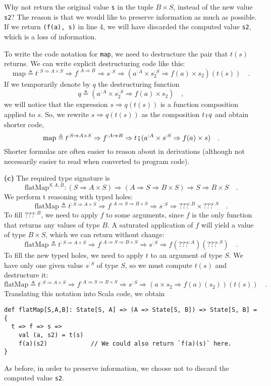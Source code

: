 \noindent Why not return the original value \lstinline!s! in the
tuple $B\times S$, instead of the new value \lstinline!s2!? The
reason is that we would like to preserve information as much as possible.
If we return \lstinline!(f(a), s)! in line 4, we will have discarded
the computed value \lstinline!s2!, which is a loss of information.

To write the code notation for \lstinline!map!, we need to destructure
the pair that $t(s)$ returns. We can write explicit destructuring
code like this:
\[
\text{map}\triangleq t^{:S\Rightarrow A\times S}\Rightarrow f^{:A\Rightarrow B}\Rightarrow s^{:S}\Rightarrow(a^{:A}\times s_{2}^{:S}\Rightarrow f(a)\times s_{2})(t(s))\quad.
\]
If we temporarily denote by $q$ the destructuring function 
\[
q\triangleq(a^{:A}\times s_{2}^{:S}\Rightarrow f(a)\times s_{2})\quad,
\]
we will notice that the expression $s\Rightarrow q(t(s))$ is a function
composition applied to $s$. So, we rewrite $s\Rightarrow q(t(s))$
as the composition $t\bef q$ and obtain shorter code, 
\[
\text{map}\triangleq t^{:S\Rightarrow A\times S}\Rightarrow f^{:A\Rightarrow B}\Rightarrow t\bef(a^{:A}\times s^{:S}\Rightarrow f(a)\times s)\quad.
\]
Shorter formulas are often easier to reason about in derivations (although
not necessarily easier to read when converted to program code).

\textbf{(c)} The required type signature is
\[
\text{flatMap}^{S,A,B}:(S\Rightarrow A\times S)\Rightarrow(A\Rightarrow S\Rightarrow B\times S)\Rightarrow S\Rightarrow B\times S\quad.
\]
We perform t reasoning with typed holes:
\[
\text{flatMap}\triangleq t^{:S\Rightarrow A\times S}\Rightarrow f^{:A\Rightarrow S\Rightarrow B\times S}\Rightarrow s^{:S}\Rightarrow\text{???}^{:B}\times???^{:S}\quad.
\]
To fill $\text{???}^{:B}$, we need to apply $f$ to some arguments,
since $f$ is the only function that returns any values of type $B$.
A saturated application of $f$ will yield a value of type $B\times S$,
which we can return without change:
\[
\text{flatMap}\triangleq t^{:S\Rightarrow A\times S}\Rightarrow f^{:A\Rightarrow S\Rightarrow B\times S}\Rightarrow s^{:S}\Rightarrow f(\text{???}^{:A})(\text{???}^{:S})\quad.
\]
To fill the new typed holes, we need to apply $t$ to an argument
of type $S$. We have only one given value $s^{:S}$ of type $S$,
so we must compute $t(s)$ and destructure it:
\[
\text{flatMap}\triangleq t^{:S\Rightarrow A\times S}\Rightarrow f^{:A\Rightarrow S\Rightarrow B\times S}\Rightarrow s^{:S}\Rightarrow\left(a\times s_{2}\Rightarrow f(a)(s_{2})\right)(t(s))\quad.
\]
Translating this notation into Scala code, we obtain
\begin{lstlisting}
def flatMap[S,A,B]: State[S, A] => (A => State[S, B]) => State[S, B] = {
  t => f => s =>
    val (a, s2) = t(s)
    f(a)(s2)            // We could also return `f(a)(s)` here.
}
\end{lstlisting}
As before, in order to preserve information, we choose not to discard
the computed value \lstinline!s2!.

